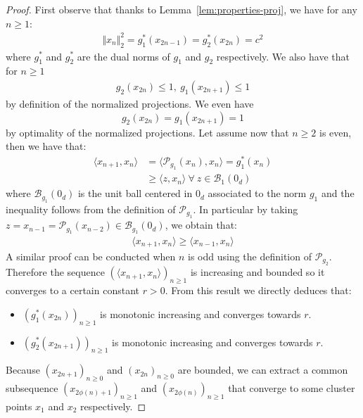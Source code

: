 \begin{proof}
First observe that thanks to Lemma~\ref{lem:properties-proj}, we have for any $n\geq 1$:
\begin{align}
\label{eq-proof-lem}
    \Vert x_n\Vert_2^2 = g_1^{*}(x_{2n-1})=g_2^{*}(x_{2n}) = c^2
\end{align}
where $g_1^*$ and $g_2^*$ are the dual norms of $g_1$ and $g_2$ respectively. We also have that for $n\geq 1$
\begin{align}
\label{eq-proof-ineq}
g_2(x_{2n}) \leq 1,~g_1(x_{2n+1})\leq 1
\end{align}
by definition of the normalized projections. We even have $$g_2(x_{2n})=g_1(x_{2n+1})=1$$ by optimality of the normalized projections. Let assume now that $n\geq 2$ is even, then we have that:
\begin{align*}
    \langle x_{n+1}, x_n\rangle &= \langle \mathcal{P}_{g_1}(x_{n}), x_n\rangle = g_1^{*}(x_n)\\
    &\geq \langle z ,x_n\rangle~\forall~z\in\mathcal{B}_1(0_d)
\end{align*}
where $\mathcal{B}_{g_1}(0_d)$ is the unit ball centered in $0_d$ associated to the norm $g_1$ and the inequality follows from the definition of $\mathcal{P}_{g_1}$. In particular by taking $z=x_{n-1}=\mathcal{P}_{g_1}(x_{n-2})\in\mathcal{B}_{g_1}(0_d)$, we obtain that:
\begin{align*}
    \langle x_{n+1}, x_n\rangle \geq \langle x_{n-1} ,x_n\rangle
\end{align*}
A similar proof can be conducted when $n$ is odd using the definition of $\mathcal{P}_{g_2}$. Therefore the sequence $(\langle x_{n+1}, x_n\rangle)_{n\geq 1}$ is increasing and bounded so it converges to a certain constant $r>0$. From this result we directly deduces that:
\begin{itemize}
    \item $(g_1^{*}(x_{2n}))_{n\geq 1}$ is monotonic increasing and converges towards $r$.
    \item $(g_2^{*}(x_{2n+1}))_{n\geq 1}$ is monotonic increasing and converges towards $r$.
\end{itemize}


Because $(x_{2n+1})_{n\geq 0}$ and $(x_{2n})_{n\geq 0}$ are bounded, we can extract a common subsequence $(x_{2\phi(n)+1})_{n\geq 1}$ and $(x_{2\phi(n)})_{n\geq 1}$ that converge to  some cluster points $x_1$ and $x_2$ respectively. 


\end{proof}
